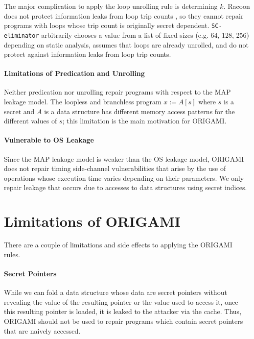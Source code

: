 The major complication to apply the loop unrolling rule is determining $k$. Racoon does not protect information leaks from loop trip counts \cite{Racoon}, so they cannot repair programs with loops whose trip count is originally secret dependent. \texttt{SC-eliminator} arbitrarily chooses a value from a list of fixed sizes (e.g. 64, 128, 256) depending on static analysis, \cite{MSESC} assumes that loops are already unrolled, and \cite{Racoon} do not protect against information leaks from loop trip counts. 

\paragraph*{Limitations of Predication and Unrolling}
Neither predication nor unrolling repair programs with respect to the MAP leakage model. The loopless and branchless program $x:=A[s]$ where $s$ is a secret and $A$ is a data structure has different memory access patterns for the different values of $s$; this limitation is the main motivation for ORIGAMI.

\paragraph*{Vulnerable to OS Leakage} Since the MAP leakage model is weaker than the OS leakage model, ORIGAMI does not repair timing side-channel vulnerabilities that arise by the use of operations whose execution time varies depending on their parameters. We only repair leakage that occurs due to accesses to data structures using secret indices.

\section{Limitations of ORIGAMI}
\label{sec:SideChannels:Limitations}
There are a couple of limitations and side effects to applying the ORIGAMI rules. 

\paragraph*{Secret Pointers} While we can fold a data structure whose data are secret pointers without revealing the value of the resulting pointer or the value used to access it, once this resulting pointer is loaded, it is leaked to the attacker via the cache. Thus, ORIGAMI should not be used to repair programs which contain secret pointers that are naively accessed. %

